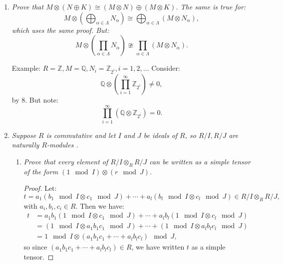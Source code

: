 \documentclass[9pt,reqno,twoside]{amsbook}
\theoremstyle{plain}
\numberwithin{section}{chapter}
\numberwithin{equation}{chapter}
\theoremstyle{definition}
\theoremstyle{remark}
\theoremstyle{plain}
\newcommand{\z}{\mathbb{Z}}
\newcommand{\Q}{\mathbb{Q}}
\newcommand{\bee}{\begin{equation}\begin{aligned}}
\newcommand{\eee}{\end{aligned}\end{equation}}
\newcommand{\tens}{\otimes}
\begin{document}
\begin{enumerate}[label=\arabic*.]
\begin{enumerate}
\item \textit{Show that if $\sum m_i \tens n_i = 0$ in $M \tens N$ where the $n_i$ are merely assumed to be $R$-linearly independent, then it is not necessarily true that all the $m_i$ are 0. [Consider $R = \z,n  =1,M = \z/2\z$, and the element $1 \tens 2$.] }
\begin{proof}
Note that now we relax the assumption that our elements from $R^n$ generate $R^n$. So now they are only linearly independent. We have:
$$
1 \tens 2 = 2 \tens 1 = 0 \tens 1 = 0,
$$
but $1 \neq 0 \in \z/2\z$, and $2$ is just a single element of some $R$ module over $R$, so it is linearly independent. So we have found a counterexample. 
\end{proof}
\end{enumerate}

\setcounter{enumi}{14}

\item \textit{Prove that $M \tens (N \oplus K) \cong (M \tens N) \oplus (M \tens K)$. The same is true for: 
$$
M \tens \left( \bigoplus_{\alpha \in \Lambda} N_\alpha \right) \cong \bigoplus_{\alpha \in \Lambda}(M \tens N_\alpha),
$$ 
which uses the same proof. But:
$$
M \tens \left( \prod_{\alpha \in \Lambda} N_\alpha \right)\ncong \prod_{\alpha \in \Lambda}(M \tens N_\alpha).
$$
}

Example: $R = \z,M = \Q,N_i = \z_{2^i},i = 1,2,...$ Consider:
$$
\Q \tens \left(\prod_{i = 1}^\infty \z_{2^i} \right) \neq 0,
$$
by 8.  But note:
$$
\prod_{i  =1}^\infty\left(\Q \tens \z_{2^i} \right) = 0. 
$$

\item \textit{Suppose $R$ is commutative and let $I$ and $J$ be ideals of $R$, so $R/I,R/J$ are naturally $R$-modules . }

\begin{enumerate}
\item \textit{Prove that every element of $R/I \tens_R R/J$ can be written as a simple tensor of the form $(1 \mod I) \tens (r \mod J)$. }

\begin{proof}
Let:
 $$
 t = a_1(b_1 \mod I \otimes c_1 \mod J) + \cdots + a_l(b_l\mod I \otimes c_l\mod J)  \in R/I \tens_R R/J,
 $$
 with $a_i,b_i,c_i \in R$. Then we have: 
 \bee
 t &= a_1b_1(1 \mod I \otimes c_1 \mod J) + \cdots + a_lb_l(1 \mod I \otimes c_l\mod J)\\
 &= (1 \mod I \otimes a_1b_1c_1 \mod J) + \cdots + (1 \mod I \otimes a_lb_lc_l\mod J)\\
 &= 1 \mod I \tens (a_1b_1c_1 + \cdots + a_lb_lc_l) \mod J,
 \eee
 so since $(a_1b_1c_1 + \cdots + a_lb_lc_l) \in R$, we have written $t$ as a simple tensor. 
\end{proof}


\end{enumerate}
\end{enumerate}
\end{document}
